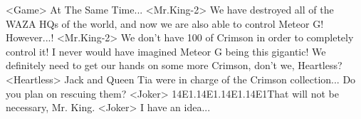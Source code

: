 <Game> At The Same Time... 
<Mr.King-2> We have destroyed all of the WAZA HQs of the world, 
and now we are also able to control Meteor G! 
However...! 
<Mr.King-2> We don't have 100%
of Crimson in order to completely control it! 
I never would have imagined Meteor G being this gigantic! 
We definitely need to get our hands on some more Crimson, don't we, Heartless? 
<Heartless> Jack and Queen Tia were in charge of the Crimson collection... 
Do you plan on rescuing them? 
<Joker> {14}{E1}.{14}{E1}.{14}{E1}.{14}{E1}That will not be necessary, Mr. King. 
<Joker> I have an idea... 
